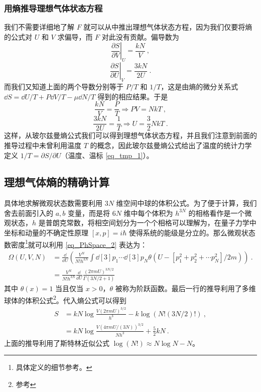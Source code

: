 \subsubsection{用熵推导理想气体状态方程}
我们不需要详细地了解 $F$ 就可以从中推出理想气体状态方程，因为我们仅要将熵的公式对 $U $ 和 $V$ 求偏导，而 $F$ 对此没有贡献。偏导数为
\begin{equation}
\left. \frac{\partial S}{\partial V} \right |_{U}^{}=\frac{kN}{V}~,
\end{equation}
\begin{equation}
\left. \frac{\partial S}{\partial U}\right |_{V}^{}=\frac{3kN}{2U}~.
\end{equation}
而我们又知道上面的两个导数分别等于 $P/T$ 和 $1/T$，这是由熵的微分关系式 $\dd S=\dd U/T+P\dd V/T-\mu \dd N/T$ 得到的相应结果。于是
\begin{equation}
\dfrac{kN}{V}=\dfrac{P}{T}\Rightarrow PV=NkT~,
\end{equation}
\begin{equation}
\dfrac{3kN}{2U} = \dfrac{1}{T}\Rightarrow U=\frac{3}{2}NkT~.
\end{equation}
这样，从玻尔兹曼熵公式我们可以得到理想气体状态方程，并且我们注意到前面的推导过程中未曾利用温度 $T$ 的概念，因此玻尔兹曼熵公式给出了温度的统计力学定义 $1/T=\partial S/\partial U$（温度、温标 \autoref{eq_tmp_1}）。
\subsection{理想气体熵的精确计算}
具体地求解微观状态数需要利用 $3N$ 维空间中球的体积公式。为了便于计算，我们舍去前面引入的 $a,b$ 变量，而是将 $6N$ 维中每个体积为 $h^{3N}$ 的相格看作是一个微观状态，$h$ 是普朗克常数，将相空间划分为一个个相格可以理解为，在量子力学中坐标和动量的不确定性原理 $[x,p]=i\hbar$ 使得系统的能级是分立的。那么微观状态数密度\footnote{具体定义的细节参考。}就可以利用 \autoref{eq_PhSpace_2} 表达为：
\begin{equation}
\begin{aligned}
\Omega(U,V,N)&=\frac{\dd }{\dd U}\left(\frac{V^N}{N! h^{3N}}\int \dd[3]{p_1}\cdots \dd[3]{p_N} \theta(U-[p_1^2+p_2^2+\cdots p_N^2]/2m)\right) ~.
\\
&=\frac{V^N}{N! h^{3N}} \frac{\dd}{\dd U} \frac{(2\pi m U)^{3N/2}}{\Gamma(3N/2+1)}
\end{aligned}
\end{equation}
其中 $\theta(x)=1$ 当且仅当 $x>0$，$\theta$ 被称为阶跃函数。最后一行的推导利用了多维球体的体积公式\footnote{参考}。代入熵公式可以得到
\begin{equation}
\begin{aligned}
S&=kN\log \frac{V(2\pi mU)^{3/2}}{h^3}-k\log (N! (3N/2)!)~,
\\
&=kN\log \frac{V(4\pi m U/(3N))^{3/2}}{Nh^3}+\frac{5}{2}kN ~.
\end{aligned}
\end{equation}
上面的推导利用了斯特林近似公式 $\log(N!)\approx N\log N-N$。

